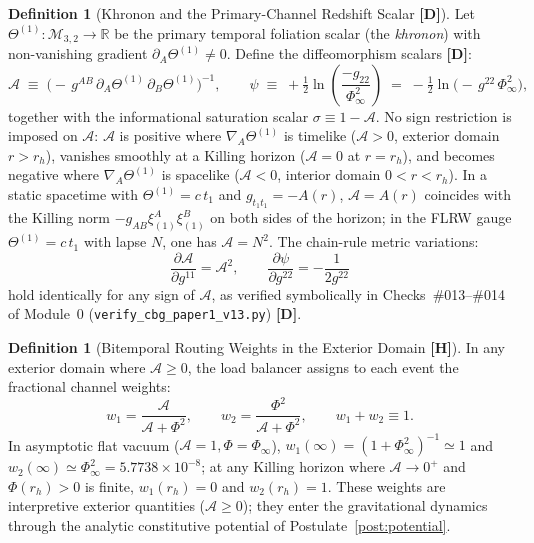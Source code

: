 \documentclass[11pt,a4paper]{article}
\newcommand{\catD}{\textbf{\textcolor{blue!75!black}{[D]}}}
\newcommand{\catH}{\textbf{\textcolor{orange!85!black}{[H]}}}
\theoremstyle{definition}
\newtheorem{definition}[theorem]{Definition}
\theoremstyle{remark}
\begin{document}
\begin{definition}[Khronon and the Primary-Channel Redshift Scalar \catD]
\label{def:khronon}
\label{def:sigma_scalar}
Let $\Theta^{(1)}: \mathcal{M}_{3,2} \to \mathbb{R}$ be the primary temporal foliation scalar (the \emph{khronon}) with non-vanishing gradient $\partial_A\Theta^{(1)} \neq 0$. Define the diffeomorphism scalars \catD:
\begin{equation}
  \mathcal{A} \;\equiv\; \Big(-\,g^{AB}\,\partial_A\Theta^{(1)}\,\partial_B\Theta^{(1)}\Big)^{-1},
  \qquad
  \psi \;\equiv\; +\tfrac{1}{2}\ln\!\left(\frac{-g_{22}}{\Phi_\infty^2}\right) \;=\; -\tfrac{1}{2}\ln\!\Big(-\,g^{22}\,\Phi_\infty^2\Big),
  \label{eq:Acal}
\end{equation}
together with the informational saturation scalar $\sigma \equiv 1 - \mathcal{A}$. No sign restriction is imposed on $\mathcal{A}$: $\mathcal{A}$ is positive where $\nabla_A\Theta^{(1)}$ is timelike ($\mathcal{A} > 0$, exterior domain $r > r_h$), vanishes smoothly at a Killing horizon ($\mathcal{A} = 0$ at $r = r_h$), and becomes negative where $\nabla_A\Theta^{(1)}$ is spacelike ($\mathcal{A} < 0$, interior domain $0 < r < r_h$). In a static spacetime with $\Theta^{(1)} = c\,t_1$ and $g_{t_1 t_1} = -A(r)$, $\mathcal{A} = A(r)$ coincides with the Killing norm $-g_{AB}\xi_{(1)}^A\xi_{(1)}^B$ on both sides of the horizon; in the FLRW gauge $\Theta^{(1)} = c\,t_1$ with lapse $N$, one has $\mathcal{A} = N^2$. The chain-rule metric variations:
\begin{equation}
  \frac{\partial\mathcal{A}}{\partial g^{11}} = \mathcal{A}^2, \qquad
  \frac{\partial\psi}{\partial g^{22}} = -\frac{1}{2 g^{22}}
  \label{eq:chain}
\end{equation}
hold identically for any sign of $\mathcal{A}$, as verified symbolically in Checks~\#013--\#014 of Module~0 (\texttt{verify\_cbg\_paper1\_v13.py}) \catD.
\end{definition}

\begin{definition}[Bitemporal Routing Weights in the Exterior Domain \catH]
\label{def:weights}
\label{def:routing_weights}
In any exterior domain where $\mathcal{A} \ge 0$, the load balancer assigns to each event the fractional channel weights:
\begin{equation}
  w_1 = \frac{\mathcal{A}}{\mathcal{A} + \Phi^2}, \qquad
  w_2 = \frac{\Phi^2}{\mathcal{A} + \Phi^2}, \qquad w_1 + w_2 \equiv 1 .
  \label{eq:exact_routing_weights}
\end{equation}
In asymptotic flat vacuum ($\mathcal{A} = 1, \Phi = \Phi_\infty$), $w_1(\infty) = (1 + \Phi_\infty^2)^{-1} \simeq 1$ and $w_2(\infty) \simeq \Phi_\infty^2 = 5.7738 \times 10^{-8}$; at any Killing horizon where $\mathcal{A} \to 0^+$ and $\Phi(r_h) > 0$ is finite, $w_1(r_h) = 0$ and $w_2(r_h) = 1$. These weights are interpretive exterior quantities ($\mathcal{A} \ge 0$); they enter the gravitational dynamics through the analytic constitutive potential of Postulate~\ref{post:potential}.
\end{definition}
\end{document}
